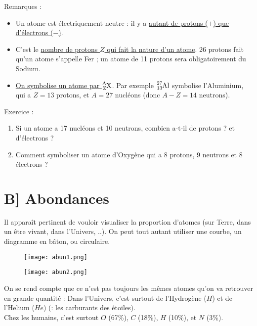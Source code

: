 \documentclass[a4paper]{article}
\begin{document}
\begin{Large}
\vspace*{1cm}
Remarques :
\begin{itemize}
\item Un atome est électriquement neutre : il y a \underline{autant de protons ($+$) que d'électrons ($-$)}.
\item C'est le \underline{nombre de protons $Z$ qui fait la nature d'un atome}. 26 protons fait qu'un atome s'appelle Fer ; un atome de 11 protons sera obligatoirement du Sodium.
\item \underline{On symbolise un atome par $\ce{^A_ZX}$}. Par exemple $\ce{^{27}_{13}Al}$ symbolise l'Aluminium, qui a $Z=13$ protons, et $A=27$ nucléons (donc $A-Z=14$ neutrons).
\end{itemize}
\vfill
Exercice :
\begin{enumerate}
\item Si un atome a 17 nucléons et 10 neutrons, combien a-t-il de protons ? et d'électrons ?
\item Comment symboliser un atome d'Oxygène qui a 8 protons, 9 neutrons et 8 électrons ?
\end{enumerate}

\newpage
\section*{B] Abondances}
Il apparaît pertinent de vouloir visualiser la proportion d'atomes (sur Terre, dans un être vivant, dans l'Univers, ..). On peut tout autant utiliser une courbe, un diagramme en bâton, ou circulaire.
\begin{figure}[H]
\begin{center}
\texttt{[image: abun1.png]}
\end{center}
\end{figure}
\begin{figure}[H]
\begin{center}
\texttt{[image: abun2.png]}
\end{center}
\end{figure}

\noindent On se rend compte que ce n'est pas toujours les mêmes atomes qu'on va retrouver en grande quantité : Dans l'Univers, c'est surtout de l'Hydrogène ($H$) et de l'Helium ($He$) (: les carburants des étoiles). \\
Chez les humains, c'est surtout $O$ (67\%), $C$ (18\%), $H$ (10\%), et $N$ (3\%).


\end{Large}
\end{document}
